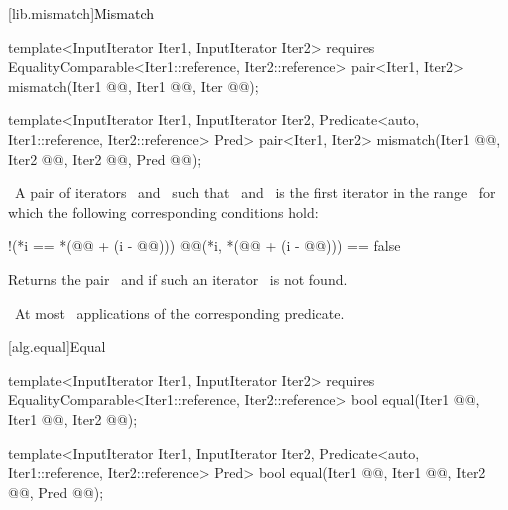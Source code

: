 \documentclass[american,twoside]{book}
\begin{document}
\begin{paras}
[lib.mismatch]{\textcolor{black}{Mismatch}}

%
\color{addclr}\begin{itemdecl}
template<InputIterator Iter1, InputIterator Iter2>
  requires EqualityComparable<Iter1::reference, Iter2::reference>
  pair<Iter1, Iter2> mismatch(Iter1 @@, Iter1 @@,
                              Iter @@);

template<InputIterator Iter1, InputIterator Iter2,
         Predicate<auto, Iter1::reference, Iter2::reference> Pred>
  pair<Iter1, Iter2> mismatch(Iter1 @@, Iter2 @@,
                              Iter2 @@, Pred @@);
\end{itemdecl}\color{black}

\begin{itemdescr}
\pnum
\returns\ 
A pair of iterators
\
and
\
such that
\
and
\tcode{i}\
is the first iterator
in the range \
for which the following corresponding conditions hold:

\begin{codeblock}
  !(*i == *(@@ + (i - @@)))
  @\farg{pred}@(*i, *(@@ + (i - @@))) == false
\end{codeblock}

Returns the pair \ and
if such an iterator
\tcode{i}\
is not found.

\pnum
\complexity\ 
At most
\tcode{\farg{last1}\ - }\
applications of the corresponding predicate.
\end{itemdescr}

\rSec2[alg.equal]{Equal}

%
\color{addclr}\begin{itemdecl}
template<InputIterator Iter1, InputIterator Iter2>
  requires EqualityComparable<Iter1::reference, Iter2::reference>
  bool equal(Iter1 @\farg{first1}@, Iter1 @@,
             Iter2 @@);

template<InputIterator Iter1, InputIterator Iter2,
         Predicate<auto, Iter1::reference, Iter2::reference> Pred>
  bool equal(Iter1 @@, Iter1 @@,
             Iter2 @@, Pred @@);
\end{itemdecl}\color{black}


\end{paras}
\end{document}
